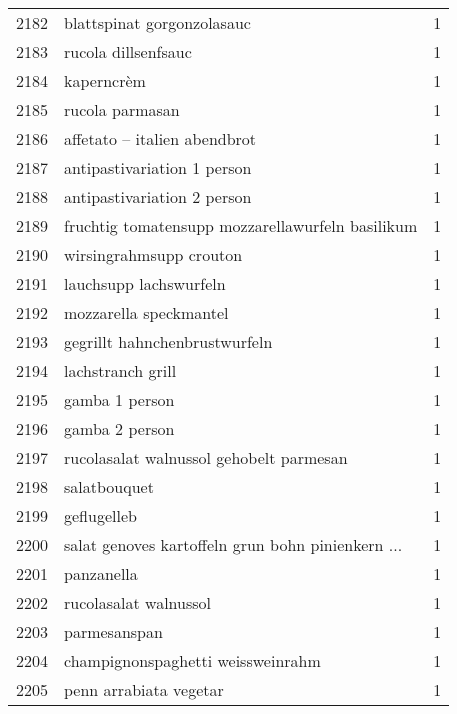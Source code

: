 \begin{tabular}{llr}
2182 &                         blattspinat gorgonzolasauc &      1 \\
2183 &                                rucola dillsenfsauc &      1 \\
2184 &                                         kaperncrèm &      1 \\
2185 &                                    rucola parmasan &      1 \\
2186 &                       affetato – italien abendbrot &      1 \\
2187 &                        antipastivariation 1 person &      1 \\
2188 &                        antipastivariation 2 person &      1 \\
2189 &   fruchtig tomatensupp mozzarellawurfeln basilikum &      1 \\
2190 &                            wirsingrahmsupp crouton &      1 \\
2191 &                             lauchsupp lachswurfeln &      1 \\
2192 &                             mozzarella speckmantel &      1 \\
2193 &                      gegrillt hahnchenbrustwurfeln &      1 \\
2194 &                                  lachstranch grill &      1 \\
2195 &                                     gamba 1 person &      1 \\
2196 &                                     gamba 2 person &      1 \\
2197 &            rucolasalat walnussol gehobelt parmesan &      1 \\
2198 &                                       salatbouquet &      1 \\
2199 &                                        geflugelleb &      1 \\
2200 &  salat genoves kartoffeln grun bohn pinienkern ... &      1 \\
2201 &                                         panzanella &      1 \\
2202 &                              rucolasalat walnussol &      1 \\
2203 &                                       parmesanspan &      1 \\
2204 &                  champignonspaghetti weissweinrahm &      1 \\
2205 &                             penn arrabiata vegetar &      1 \\

\end{tabular}
